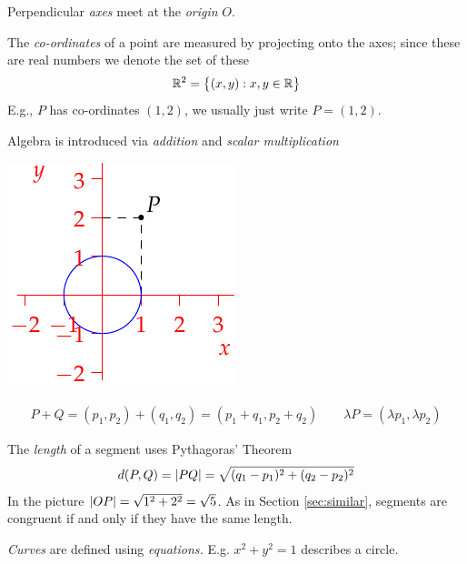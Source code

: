 \begin{itemize}\itemsep2pt
  \begin{minipage}[t]{0.72\linewidth}\vspace{-5pt}
  	\item Perpendicular \emph{axes} meet at the \emph{origin} $O$.
  	\item The \emph{co-ordinates} of a point are measured by projecting onto the axes; since these are real numbers we denote the set of these
  	\[
  		\mathbb{R}^2=\bigl\{(x,y):x,y\in\mathbb{R}\bigr\}
  	\]
  	E.g., $P$ has co-ordinates $(1,2)$, we usually just write $P=(1,2)$.
  	\item Algebra is introduced via \emph{addition} and \emph{scalar multiplication}
	\end{minipage}
	\hfill
	\begin{minipage}[t]{0.27\linewidth}\vspace{-5pt}
		\flushright\includegraphics{analytic-axes}
	\end{minipage}\par\vspace{-15pt}
  \begin{gather*}
  	P+Q=(p_1,p_2)+(q_1,q_2)=(p_1+q_1,p_2+q_2)\qquad
  	\lambda P=(\lambda p_1,\lambda p_2)
  \end{gather*}
  \item The \emph{length} of a segment uses Pythagoras' Theorem%
  \[
  	d(P,Q)=\left| PQ\right| =\sqrt{(q_1-p_1)^2+(q_2-p_2)^2}
  \]
  In the picture $\left| OP\right|=\sqrt{1^2+2^2}=\sqrt 5$. As in Section \ref{sec:similar}, segments are congruent if and only if they have the same length.

  \item \emph{Curves} are defined using \emph{equations.} E.g.{} $x^2+y^2=1$ describes a circle. 
\end{itemize}


